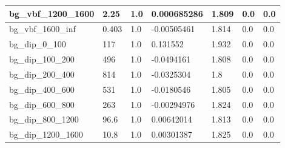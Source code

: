 \documentclass[a4paper, 10pt]{article}
\begin{document}
\begin{table}[H]
\begin{center}
\begin{tabular}{|m{23.0mm}|m{23.0mm}|m{18.0mm}|m{19.0mm}|m{19.0mm}|m{19.0mm}|m{19.0mm}|}
      \hline
      {\cellcolor{white}         bg\_vbf\_1200\_1600}& {\cellcolor{white}         2.25}& {\cellcolor{white}         1.0}& {\cellcolor{white}         0.000685286}& {\cellcolor{white}         1.809}& {\cellcolor{green}         0.0}& {\cellcolor{green}         0.0}\\
      \hline
      {\cellcolor{white}         bg\_vbf\_1600\_inf}& {\cellcolor{white}         0.403}& {\cellcolor{white}         1.0}& {\cellcolor{white}         -0.00505461}& {\cellcolor{white}         1.814}& {\cellcolor{green}         0.0}& {\cellcolor{green}         0.0}\\
      \hline
      {\cellcolor{white}         bg\_dip\_0\_100}& {\cellcolor{white}         117}& {\cellcolor{white}         1.0}& {\cellcolor{white}         0.131552}& {\cellcolor{white}         1.932}& {\cellcolor{green}         0.0}& {\cellcolor{green}         0.0}\\
      \hline
      {\cellcolor{white}         bg\_dip\_100\_200}& {\cellcolor{white}         496}& {\cellcolor{white}         1.0}& {\cellcolor{white}         -0.0494161}& {\cellcolor{white}         1.808}& {\cellcolor{green}         0.0}& {\cellcolor{green}         0.0}\\
      \hline
      {\cellcolor{white}         bg\_dip\_200\_400}& {\cellcolor{white}         814}& {\cellcolor{white}         1.0}& {\cellcolor{white}         -0.0325304}& {\cellcolor{white}         1.8}& {\cellcolor{green}         0.0}& {\cellcolor{green}         0.0}\\
      \hline
      {\cellcolor{white}         bg\_dip\_400\_600}& {\cellcolor{white}         531}& {\cellcolor{white}         1.0}& {\cellcolor{white}         -0.0180546}& {\cellcolor{white}         1.805}& {\cellcolor{green}         0.0}& {\cellcolor{green}         0.0}\\
      \hline
      {\cellcolor{white}         bg\_dip\_600\_800}& {\cellcolor{white}         263}& {\cellcolor{white}         1.0}& {\cellcolor{white}         -0.00294976}& {\cellcolor{white}         1.824}& {\cellcolor{green}         0.0}& {\cellcolor{green}         0.0}\\
      \hline
      {\cellcolor{white}         bg\_dip\_800\_1200}& {\cellcolor{white}         96.6}& {\cellcolor{white}         1.0}& {\cellcolor{white}         0.00642014}& {\cellcolor{white}         1.813}& {\cellcolor{green}         0.0}& {\cellcolor{green}         0.0}\\
      \hline
      {\cellcolor{white}         bg\_dip\_1200\_1600}& {\cellcolor{white}         10.8}& {\cellcolor{white}         1.0}& {\cellcolor{white}         0.00301387}& {\cellcolor{white}         1.825}& {\cellcolor{green}         0.0}& {\cellcolor{green}         0.0}\\

\end{tabular}
\end{center}
\end{table}
\end{document}
